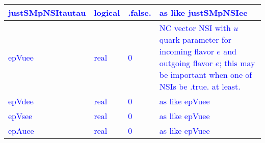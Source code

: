\documentclass{article}
\begin{document}
\begin{longtable}{llll}
\midrule
\textcolor{blue}{justSMpNSItautau} & \begin{minipage}[t]{2cm}\textcolor{blue}{logical}\end{minipage} & \begin{minipage}[t]{2cm}\textcolor{blue}{.false.}\end{minipage} & \begin{minipage}[t]{12cm}\textcolor{blue}{as like justSMpNSIee}\end{minipage}\\*
\midrule
\textcolor{blue}{epVuee} & \begin{minipage}[t]{2cm}\textcolor{blue}{real}\end{minipage} & \begin{minipage}[t]{2cm}\textcolor{blue}{0}\end{minipage} & \begin{minipage}[t]{12cm}\textcolor{blue}{NC vector NSI with $u$ quark parameter for incoming flavor $e$ and outgoing flavor $e$; this may be important when one of NSIs be .true. at least.}\end{minipage}\\*
\midrule
\textcolor{blue}{epVdee} & \begin{minipage}[t]{2cm}\textcolor{blue}{real}\end{minipage} & \begin{minipage}[t]{2cm}\textcolor{blue}{0}\end{minipage} & \begin{minipage}[t]{12cm}\textcolor{blue}{as like epVuee}\end{minipage}\\*
\midrule
\textcolor{blue}{epVsee} & \begin{minipage}[t]{2cm}\textcolor{blue}{real}\end{minipage} & \begin{minipage}[t]{2cm}\textcolor{blue}{0}\end{minipage} & \begin{minipage}[t]{12cm}\textcolor{blue}{as like epVuee}\end{minipage}\\*
\midrule
\textcolor{blue}{epAuee} & \begin{minipage}[t]{2cm}\textcolor{blue}{real}\end{minipage} & \begin{minipage}[t]{2cm}\textcolor{blue}{0}\end{minipage} & \begin{minipage}[t]{12cm}\textcolor{blue}{as like epVuee}\end{minipage}\\*

\end{longtable}
\end{document}
